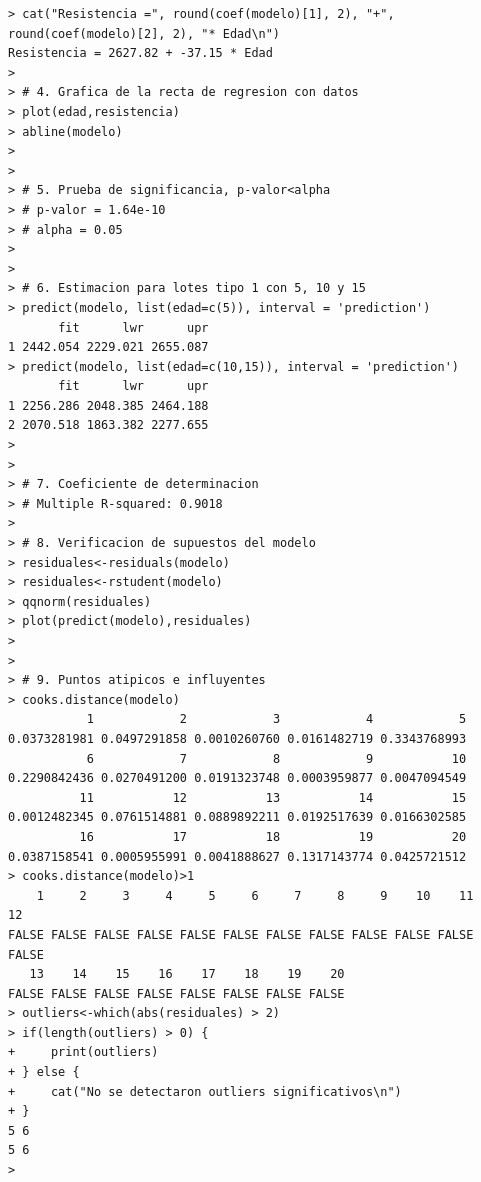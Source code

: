\documentclass[12pt,a4paper]{article}
\begin{document}
\begin{lstlisting}
> cat("Resistencia =", round(coef(modelo)[1], 2), "+", round(coef(modelo)[2], 2), "* Edad\n")
Resistencia = 2627.82 + -37.15 * Edad
> 
> # 4. Grafica de la recta de regresion con datos
> plot(edad,resistencia)
> abline(modelo)
> 
> 
> # 5. Prueba de significancia, p-valor<alpha
> # p-valor = 1.64e-10
> # alpha = 0.05
> 
> 
> # 6. Estimacion para lotes tipo 1 con 5, 10 y 15
> predict(modelo, list(edad=c(5)), interval = 'prediction')
       fit      lwr      upr
1 2442.054 2229.021 2655.087
> predict(modelo, list(edad=c(10,15)), interval = 'prediction')
       fit      lwr      upr
1 2256.286 2048.385 2464.188
2 2070.518 1863.382 2277.655
> 
> 
> # 7. Coeficiente de determinacion
> # Multiple R-squared: 0.9018
> 
> # 8. Verificacion de supuestos del modelo
> residuales<-residuals(modelo)
> residuales<-rstudent(modelo)
> qqnorm(residuales)
> plot(predict(modelo),residuales)
> 
> 
> # 9. Puntos atipicos e influyentes
> cooks.distance(modelo)
           1            2            3            4            5 
0.0373281981 0.0497291858 0.0010260760 0.0161482719 0.3343768993 
           6            7            8            9           10 
0.2290842436 0.0270491200 0.0191323748 0.0003959877 0.0047094549 
          11           12           13           14           15 
0.0012482345 0.0761514881 0.0889892211 0.0192517639 0.0166302585 
          16           17           18           19           20 
0.0387158541 0.0005955991 0.0041888627 0.1317143774 0.0425721512 
> cooks.distance(modelo)>1
    1     2     3     4     5     6     7     8     9    10    11    12 
FALSE FALSE FALSE FALSE FALSE FALSE FALSE FALSE FALSE FALSE FALSE FALSE 
   13    14    15    16    17    18    19    20 
FALSE FALSE FALSE FALSE FALSE FALSE FALSE FALSE 
> outliers<-which(abs(residuales) > 2)
> if(length(outliers) > 0) {
+     print(outliers)
+ } else {
+     cat("No se detectaron outliers significativos\n")
+ }
5 6 
5 6 
>
\end{lstlisting}
\end{document}
